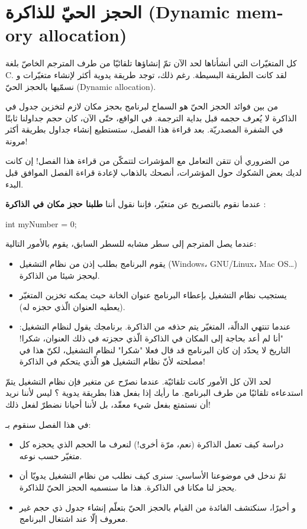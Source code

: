 \chapter{الحجز الحيّ للذاكرة
(\textenglish{Dynamic memory allocation})}

كل المتغيّرات التي أنشأناها لحد الآن تمّ إنشاؤها تلقائيّا من طرف المترجم الخاصّ بلغة
\textenglish{C}.
لقد كانت الطريقة البسيطة. رغم ذلك، توجد طريقة يدوية أكثر لإنشاء متغيّرات و نسمّيها بالحجز الحيّ
(\textenglish{Dynamic allocation}).

من بين فوائد الحجز الحيّ هو السماح لبرنامج بحجز مكان لازم لتخزين جدول في الذاكرة لا يُعرف حجمه قبل بداية الترجمة. في الواقع، حتّى الآن، كان حجم جداولنا ثابتًا في الشفرة المصدريّة. بعد قراءة هذا الفصل، ستستطيع إنشاء جداول بطريقة أكثر مرونة!

من الضروري أن تتقن التعامل مع المؤشرات لتتمكّن من قراءة هذا الفصل! إن كانت لديك بعض الشكوك حول المؤشرات، أنصحك بالذهاب لإعادة قراءة الفصل الموافق قبل البدء.

عندما نقوم بالتصريح عن متغيّر، فإننا نقول أننا
\textbf{طلبنا حجز مكان في الذاكرة} :

\begin{Csource}
int myNumber = 0;
\end{Csource}

عندما يصل المترجم إلى سطر مشابه للسطر السابق، يقوم بالأمور التالية:

\begin{itemize}
  \item يقوم البرنامج بطلب إذن من نظام التشغيل
(\textenglish{Windows}، \textenglish{GNU/Linux}، \textenglish{Mac OS}\dots)
ليحجز شيئا من الذاكرة.
  \item يستجيب نظام التشغيل بإعطاء البرنامج عنوان الخانة حيث يمكنه تخزين المتغيّر (يعطيه العنوان الّذي حجزه له).
  \item عندما تنتهي الدالّة، المتغيّر يتم حذفه من الذاكرة. برنامجك يقول لنظام التشغيل: "أنا لم أعد بحاجة إلى المكان في الذاكرة الّذي حجزته في ذلك العنوان، شكرا! التاريخ لا يحدّد إن كان البرنامج قد قال فعلا "شكرا" لنظام التشغيل، لكنّ هذا في مصلحته لأنّ نظام التشغيل هو الّذي يتحكم في الذاكرة!
\end{itemize}

لحد الآن كل الأمور كانت تلقائيّة. عندما نصرّح عن متغير فإن نظام التشغيل يتمّ استدعاءه تلقائيًا من طرف البرنامج.
ما رأيك إذا بفعل هذا بطريقة يدوية ؟ ليس لأننا نريد أن نستمتع بفعل شيء معقّد، بل لأننا أحيانا نضطرّ لفعل ذلك!

في هذا الفصل سنقوم بـ:

\begin{itemize}
  \item دراسة كيف تعمل الذاكرة (نعم، مرّة أخرى!) لنعرف ما الحجم الذي يحجزه كل متغيّر حسب نوعه.
  \item ثمّ ندخل في موضوعنا الأساسي: سنرى كيف نطلب من نظام التشغيل يدويّا أن يحجز لنا مكانا في الذاكرة. هذا ما سنسميه الحجز الحيّ للذاكرة.
  \item و أخيرًا، سنكتشف الفائدة من القيام بالحجز الحيّ بتعلّم إنشاء جدول ذي حجم غير معروف إلّا عند اشتغال البرنامج.
\end{itemize}

